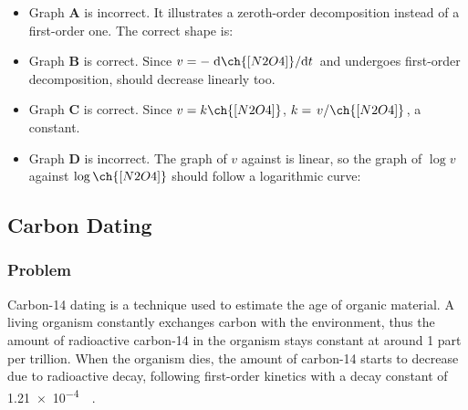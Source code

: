 \documentclass[12pt, a4paper, twoside]{pancake-book}
\newcommand*{\slf}[2]{\slashfrac[auto]{#1}{#2}}
\begin{document}
\begin{itemize}
	\item Graph \textbf{A} is {\color{accent} incorrect}. It illustrates a zeroth-order decomposition instead of a first-order one. The correct shape is:
	      \begin{center}
	      \end{center}
	\item Graph \textbf{B} is {\color{accent} correct}. Since \(v = -\odv{\ch{[N2O4]}}/{t}\)
	      and  undergoes first-order decomposition, \ch{[N2O4]} should decrease
	      linearly too.
	\item Graph \textbf{C} is {\color{accent} correct}. Since \(v = k\ch{[N2O4]}\),
	      \(k = \slf{v}{\ch{[N2O4]}}\), a constant.
	\item Graph \textbf{D} is {\color{accent} incorrect}. The graph of \(v\) against
	      \ch{[N2O4]} is linear, so the graph of \(\log v\) against \(\log \ch{[N2O4]}\)
	      should follow a logarithmic curve:
	      \begin{center}
	      \end{center}
\end{itemize}

\subsection{Carbon Dating}
\subsubsection{Problem}
Carbon-14 dating is a technique used to estimate the age of organic material. A living organism constantly exchanges carbon with the environment, thus the amount
of radioactive carbon-14 in the organism stays constant at around 1 part per trillion.
When the organism dies, the amount of carbon-14 starts to decrease due to radioactive decay, following first-order kinetics with a decay constant of \qty{1.21e-4}{\per\year}.
\end{document}
